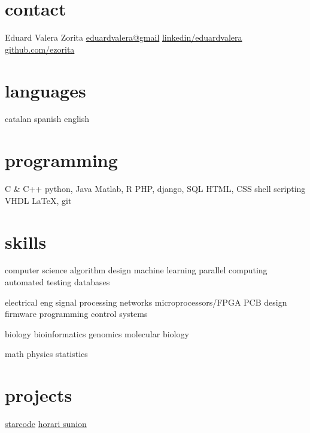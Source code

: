 \documentclass[]{friggeri-cv} %
\begin{document}



\begin{aside} %
  \section{contact}
  {\FA \faUser}
  Eduard Valera Zorita
  {\FA \faEnvelope}
  \href{mailto:eduardvalera@gmail.com}{eduardvalera@gmail}
  {\FA \faLinkedinSign}
  \href{http://www.linkedin.com/in/eduardvalera}{linkedin/eduardvalera}
  {\FA \faGithubSign}
  \href{http://github.com/ezorita}{github.com/ezorita}
  \section{languages}
  catalan
  spanish
  english
  \section{programming}
  C \& C++
  python, Java
  Matlab, R
  PHP, django, SQL
  HTML, CSS
  shell scripting
  VHDL
  \LaTeX, git
  \section{skills}
  computer science
  algorithm design
  machine learning
  parallel computing
  automated testing
  databases

  electrical eng
  signal processing
  networks
  microprocessors/FPGA
  PCB design
  firmware programming
  control systems

  biology
  bioinformatics
  genomics
  molecular biology

  math
  physics
  statistics
  \section{projects}
  \href{http://github.com/gui11aume/starcode}{starcode}
  \href{http://horari.sunion.cat}{horari sunion}
\end{aside}

\end{document}
